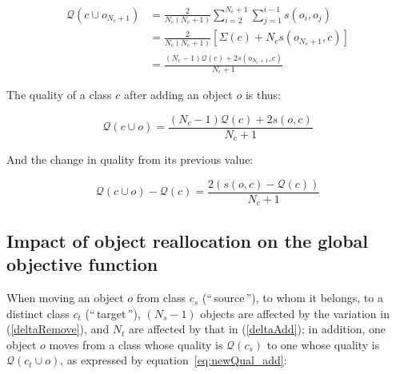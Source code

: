 \documentclass[twoside,11pt]{article}
\newcommand{\gl}[1]{``\,#1\,''} %
\begin{document}
\begin{equation*}
  \begin{aligned}
    \mathcal{Q}(c \cup o_{N_c+1}) & = \frac{2}{N_c(N_c+1)} \sum_{i=2}^{N_c+1} \sum_{j=1}^{i-1} s\left(o_i, o_j\right) \\
                                & = \frac{2}{N_c(N_c+1)} \left[\Sigma(c) + N_c s\left(o_{N_c+1}, c\right)\right] \\
                                & = \frac{(N_c-1) \mathcal{Q}(c)  + 2s\left(o_{N_c+1}, c\right)}{N_c+1}
  \end{aligned}
\end{equation*}

\noindent The quality of a class $c$ after adding an object $o$ is thus:

\begin{equation}
  \mathcal{Q}\left(c \cup o\right) = \frac{(N_c-1) \mathcal{Q}(c)  + 2s\left(o, c\right)}{N_c+1}
  \label{eq:newQual_add}
\end{equation}

\noindent And the change in quality from its previous value:

\begin{equation} \label{deltaAdd}
    \mathcal{Q}\left(c \cup o\right) - \mathcal{Q}\left(c\right)  = \frac{2\left(s\left(o, c\right)-\mathcal{Q}(c)\right)}{N_c+1}
\end{equation}


\subsection{Impact of object reallocation on the global objective function}

When moving an object $o$ from class $c_s$ (\gl{source}), to whom it belongs, to a
distinct class $c_t$ (\gl{target}), $(N_s-1)$ objects are affected
by the variation in (\ref{deltaRemove}), and $N_t$ are affected
by that in (\ref{deltaAdd}); in addition, one object $o$ moves from a class whose quality is $\mathcal{Q}(c_s)$ to one whose quality is $\mathcal{Q}\left(c_t \cup o\right)$, as expressed by equation~\ref{eq:newQual_add}:
\end{document}
